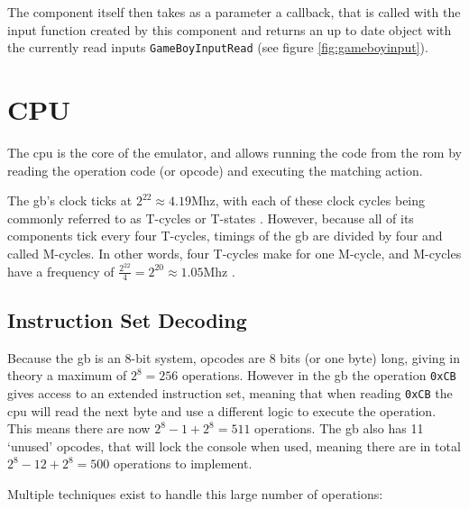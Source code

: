 \documentclass[11pt]{informatics-report}
\begin{document}
The component itself then takes as a parameter a callback, that is called with the input function created by this component and returns an up to date object with the currently read inputs \texttt{GameBoyInputRead} (see figure \ref{fig:gameboyinput}).

\section{CPU}

The \gls{cpu} is the core of the emulator, and allows running the code from the \gls{rom} by reading the operation code (or opcode) and executing the matching action.

The \glsdesc{gb}'s clock ticks at $2^{22}\approx 4.19$Mhz, with each of these clock cycles being commonly referred to as T-cycles or T-states \cite[CPU Instruction Set]{pandoc}. However, because all of its components tick every four T-cycles, timings of the \gls{gb} are divided by four and called M-cycles. In other words, four T-cycles make for one M-cycle, and M-cycles have a frequency of $\frac{2^{22}}{4}=2^{20}\approx 1.05$Mhz \cite{gbcpumanual}.

\subsection{Instruction Set Decoding}

Because the \glsdesc{gb} is an 8-bit system, opcodes are 8 bits (or one byte) long, giving in theory a maximum of $2^8=256$ operations. However in the \gls{gb} the operation \texttt{0xCB} gives access to an extended instruction set, meaning that when reading \texttt{0xCB} the \gls{cpu} will read the next byte and use a different logic to execute the operation. This means there are now $2^8 - 1 + 2^8=511$ operations. The \gls{gb} also has 11 `unused' opcodes, that will lock the console when used\cite[CPU Comparison with Z80]{pandoc}, meaning there are in total $2^8 - 12 + 2^8 = 500$ operations to implement.

Multiple techniques exist to handle this large number of operations:
\end{document}
